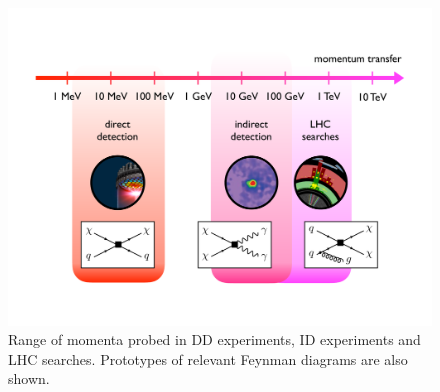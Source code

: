 \documentclass[review]{elsarticle}
\begin{document}
\begin{figure}[t!]
\centering
\includegraphics[width=.85\textwidth]{figure1.pdf}
\vspace{2mm}
\caption{\label{fig:momentumtransfer} Range of momenta probed in DD experiments, ID experiments and LHC searches. Prototypes of relevant Feynman diagrams are also shown. }
\end{figure}
\end{document}
